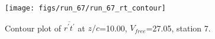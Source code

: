 \begin{figure}[H]
\centering
\texttt{[image: figs/run\_67/run\_67\_rt\_contour]}
\caption{Contour plot of $\overline{r^\prime t^\prime}$ at $z/c$=10.00, $V_{free}$=27.05, station 7.}
\label{fig:run_67_rt_contour}
\end{figure}


